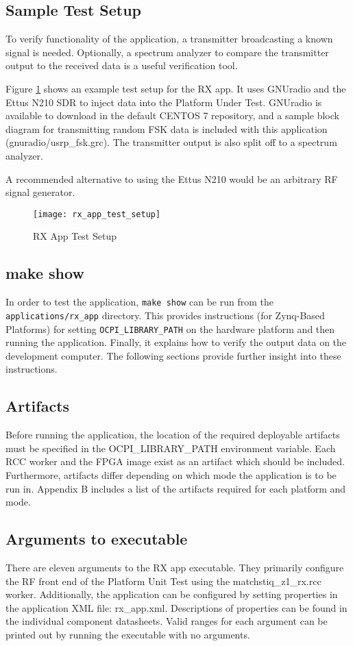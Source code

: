 \subsection{Sample Test Setup}
\noindent To verify functionality of the application, a transmitter broadcasting a known signal is needed. Optionally, a spectrum analyzer to compare the transmitter output to the received data is a useful verification tool.\par\medskip
\noindent Figure \ref{fig:rx_app_test_setup} shows an example test setup for the RX app. It uses GNUradio and the Ettus N210 SDR to inject data into the Platform Under Test. GNUradio is available to download in the default CENTOS 7 repository, and a sample block diagram for transmitting random FSK data is included with this application (gnuradio/usrp\_fsk.grc). The transmitter output is also split off to a spectrum analyzer.\par\bigskip
\noindent A recommended alternative to using the Ettus N210 would be an arbitrary RF signal generator.
	\begin{figure}[H]
	 	\centering
		\texttt{[image: rx\_app\_test\_setup]}
		\caption{RX App Test Setup}
		\label{fig:rx_app_test_setup}
	\end{figure}
\subsection{make show}
\noindent In order to test the application, \texttt{make show} can be run from the \texttt{applications/rx\_app} directory. This provides instructions (for Zynq-Based Platforms) for setting \texttt{OCPI\_LIBRARY\_PATH} on the hardware platform and then running the application. Finally, it explains how to verify the output data on the development computer. The following sections provide further insight into these instructions.
\subsection{Artifacts}
\noindent Before running the application, the location of the required deployable artifacts must be specified in the OCPI\_LIBRARY\_PATH environment variable. Each RCC worker and the FPGA image exist as an artifact which should be included. Furthermore, artifacts differ depending on which mode the application is to be run in. Appendix B includes a list of the artifacts required for each platform and mode.
\newpage
\subsection{Arguments to executable}
\noindent There are eleven arguments to the RX app executable. They primarily configure the RF front end of the Platform Unit Test using the matchstiq\_z1\_rx.rcc worker. Additionally, the application can be configured by setting properties in the application XML file: rx\_app.xml. Descriptions of properties can be found in the individual component datasheets. Valid ranges for each argument can be printed out by running the executable with no arguments.\par\medskip

